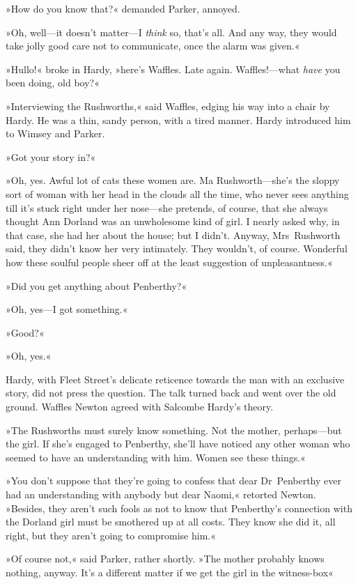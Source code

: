 »How do you know that?« demanded Parker, annoyed.

»Oh, well—it doesn't matter—I \textit{think} so, that's all. And any way, they would take jolly good care not to communicate, once the alarm was given.«

»Hullo!« broke in Hardy, »here's Waffles. Late again. Waffles!—what \textit{have} you been doing, old boy?«

»Interviewing the Rushworths,« said Waffles, edging his way into a chair by Hardy. He was a thin, sandy person, with a tired manner. Hardy introduced him to Wimsey and Parker.

»Got your story in?«

»Oh, yes. Awful lot of cats these women are. Ma Rushworth—she's the sloppy sort of woman with her head in the clouds all the time, who never sees anything till it's stuck right under her nose—she pretends, of course, that she always thought Ann Dorland was an unwholesome kind of girl. I nearly asked why, in that case, she had her about the house; but I didn't. Anyway, Mrs~Rushworth said, they didn't know her very intimately. They wouldn't, of course. Wonderful how these soulful people sheer off at the least suggestion of unpleasantness.«

»Did you get anything about Penberthy?«

»Oh, yes—I got something.«

»Good?«

»Oh, yes.«

Hardy, with Fleet Street's delicate reticence towards the man with an exclusive story, did not press the question. The talk turned back and went over the old ground. Waffles Newton agreed with Salcombe Hardy's theory.

»The Rushworths must surely know something. Not the mother, perhaps—but the girl. If she's engaged to Penberthy, she'll have noticed any other woman who seemed to have an understanding with him. Women see these things.«

»You don't suppose that they're going to confess that dear Dr~Penberthy ever had an understanding with anybody but dear Naomi,« retorted Newton. »Besides, they aren't such fools as not to know that Penberthy's connection with the Dorland girl must be smothered up at all costs. They know she did it, all right, but they aren't going to compromise him.«

»Of course not,« said Parker, rather shortly. »The mother probably knows nothing, anyway. It's a different matter if we get the girl in the witness-box\longdash«

